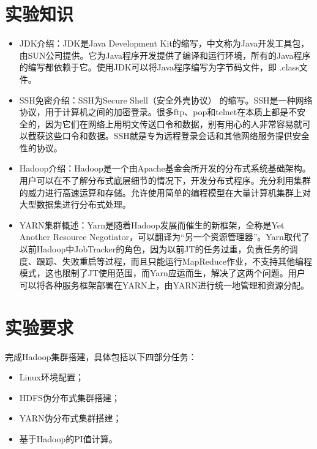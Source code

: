 \documentclass {article}
\begin{document}
	\section{实验知识}	
		\begin{itemize}
			\item JDK介绍：JDK是Java Development Kit的缩写，中文称为Java开发工具包，由SUN公司提供。它为Java程序开发提供了编译和运行环境，所有的Java程序的编写都依赖于它。使用JDK可以将Java程序编写为字节码文件，即 .class文件。
			\item SSH免密介绍：SSH为Secure Shell（安全外壳协议） 的缩写。SSH是一种网络协议，用于计算机之间的加密登录。很多ftp、pop和telnet在本质上都是不安全的，因为它们在网络上用明文传送口令和数据，别有用心的人非常容易就可以截获这些口令和数据。SSH就是专为远程登录会话和其他网络服务提供安全性的协议。
			\item Hadoop介绍：Hadoop是一个由Apache基金会所开发的分布式系统基础架构。用户可以在不了解分布式底层细节的情况下，开发分布式程序。充分利用集群的威力进行高速运算和存储。允许使用简单的编程模型在大量计算机集群上对大型数据集进行分布式处理。
			\item YARN集群概述：Yarn是随着Hadoop发展而催生的新框架，全称是Yet Another Resource Negotiator，可以翻译为“另一个资源管理器”。Yarn取代了以前Hadoop中JobTracker的角色，因为以前JT的任务过重，负责任务的调度、跟踪、失败重启等过程，而且只能运行MapReduce作业，不支持其他编程模式，这也限制了JT使用范围，而Yarn应运而生，解决了这两个问题。用户可以将各种服务框架部署在YARN上，由YARN进行统一地管理和资源分配。
		\end{itemize}
	
	\section{实验要求}
		完成Hadoop集群搭建，具体包括以下四部分任务：
		\begin{itemize}
			\item Linux环境配置；
			\item HDFS伪分布式集群搭建；
			\item YARN伪分布式集群搭建；
			\item 基于Hadoop的PI值计算。
		\end{itemize}
	
\end{document}
